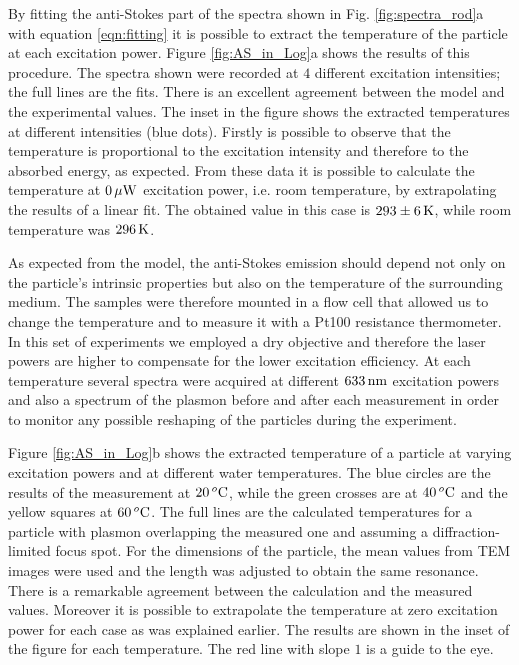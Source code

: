 By fitting the anti-Stokes part of the spectra shown in Fig.
\ref{fig:spectra_rod}a with equation \ref{eqn:fitting} it is possible to extract
the temperature of the particle at each excitation power. Figure
\ref{fig:AS_in_Log}a shows the results of this procedure. The spectra shown were
recorded at $4$ different excitation intensities; the full lines are the fits.
There is an excellent agreement between the model and the experimental values.
The inset in the figure shows the extracted temperatures at different
intensities (blue dots). Firstly is possible to observe that the temperature is
proportional to the excitation intensity and therefore to the absorbed energy,
as expected. From these data it is possible to calculate the temperature at
$0\,\mu\textrm{W}$ excitation power, i.e. room temperature, by extrapolating the results of a linear fit. The
obtained value in this case is $293\pm 6 \,\textrm{K}$, while room temperature was
$296\,\textrm{K}$.


As expected from the model, the anti-Stokes emission should depend not only on
the particle's intrinsic properties but also on the temperature of the
surrounding medium\cite{Konrad2013}. The samples were therefore mounted in a
flow cell that allowed us to change the temperature and to measure it with a
Pt100 resistance thermometer. In this set of experiments we employed a dry
objective and therefore the laser powers are higher to compensate for the lower
excitation efficiency. At each temperature several spectra were acquired at
different $633\,\textrm{nm}$ excitation powers and also a spectrum of the plasmon before
and after each measurement in order to monitor any possible reshaping of the
particles during the experiment.

Figure \ref{fig:AS_in_Log}b shows the extracted temperature of a particle at
varying excitation powers and at different water temperatures. The blue circles
are the results of the measurement at $20\,^o\textrm{C}$, while the green crosses are
at $40\,^o\textrm{C}$ and the yellow squares at $60\,^o\textrm{C}$. The full lines are the
calculated temperatures for a particle with plasmon overlapping the measured one
and assuming a diffraction-limited focus spot. For the dimensions of the
particle, the mean values from TEM images were used and the length was adjusted
to obtain the same resonance. There is a remarkable agreement between the
calculation and the measured values. Moreover it is possible to extrapolate the
temperature at zero excitation power for each case as was explained earlier. The
results are shown in the inset of the figure for each temperature. The red line
with slope $1$ is a guide to the eye.

